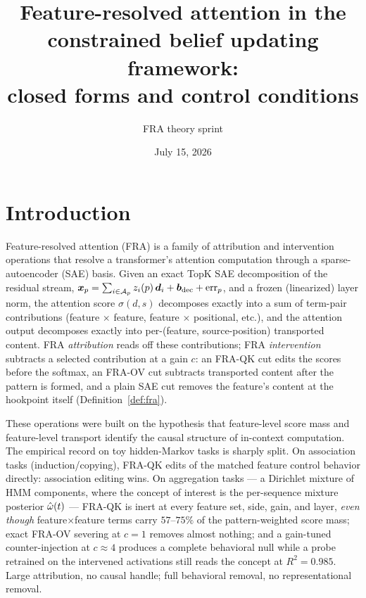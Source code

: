 \documentclass{article}
\title{Feature-resolved attention in the constrained belief updating framework:\\ closed forms and control conditions}
\author{FRA theory sprint}
\date{July 15, 2026}
\begin{document}
\maketitle

\section{Introduction}

Feature-resolved attention (FRA) is a family of attribution and intervention operations that resolve a transformer's attention computation through a sparse-autoencoder (SAE) basis. Given an exact TopK SAE decomposition of the residual stream, $\boldsymbol{x}_p = \sum_{i \in \mathcal{A}_p} z_i(p)\, \boldsymbol{d}_i + \boldsymbol{b}_{\mathrm{dec}} + \mathrm{err}_p$, and a frozen (linearized) layer norm, the attention score $\sigma(d,s)$ decomposes exactly into a sum of term-pair contributions (feature $\times$ feature, feature $\times$ positional, etc.), and the attention output decomposes exactly into per-(feature, source-position) transported content. FRA \emph{attribution} reads off these contributions; FRA \emph{intervention} subtracts a selected contribution at a gain $c$: an FRA-QK cut edits the scores before the softmax, an FRA-OV cut subtracts transported content after the pattern is formed, and a plain SAE cut removes the feature's content at the hookpoint itself (Definition~\ref{def:fra}).

These operations were built on the hypothesis that feature-level score mass and feature-level transport identify the causal structure of in-context computation. The empirical record on toy hidden-Markov tasks is sharply split. On association tasks (induction/copying), FRA-QK edits of the matched feature control behavior directly: association editing wins. On aggregation tasks --- a Dirichlet mixture of HMM components, where the concept of interest is the per-sequence mixture posterior $\hat{\omega}(t)$ --- FRA-QK is inert at every feature set, side, gain, and layer, \emph{even though} feature$\times$feature terms carry $57$--$75\%$ of the pattern-weighted score mass; exact FRA-OV severing at $c=1$ removes almost nothing; and a gain-tuned counter-injection at $c \approx 4$ produces a complete behavioral null while a probe retrained on the intervened activations still reads the concept at $R^2 = 0.985$. Large attribution, no causal handle; full behavioral removal, no representational removal.
\end{document}
